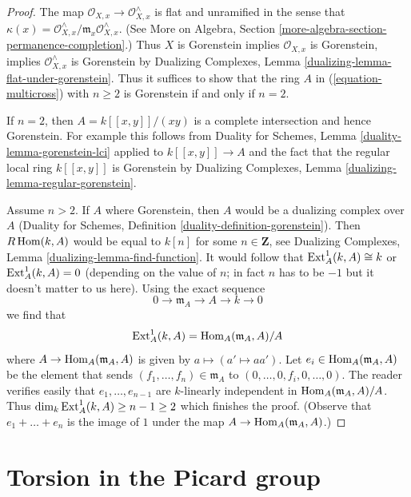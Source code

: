 \begin{proof}
The map $\mathcal{O}_{X, x} \to \mathcal{O}_{X, x}^\wedge$
is flat and unramified in the sense that
$\kappa(x) = \mathcal{O}_{X, x}^\wedge/\mathfrak m_x \mathcal{O}_{X, x}^\wedge$.
(See More on Algebra, Section \ref{more-algebra-section-permanence-completion}.)
Thus $X$ is Gorenstein implies $\mathcal{O}_{X, x}$ is Gorenstein, implies
$\mathcal{O}_{X, x}^\wedge$ is Gorenstein by
Dualizing Complexes, Lemma \ref{dualizing-lemma-flat-under-gorenstein}.
Thus it suffices to show that the ring $A$ in
(\ref{equation-multicross}) with $n \geq 2$
is Gorenstein if and only if $n = 2$.

\medskip\noindent
If $n = 2$, then $A = k[[x, y]]/(xy)$ is a complete intersection
and hence Gorenstein. For example this follows from
Duality for Schemes, Lemma \ref{duality-lemma-gorenstein-lci}
applied to $k[[x, y]] \to A$ and the fact that the regular
local ring $k[[x, y]]$ is Gorenstein by
Dualizing Complexes, Lemma \ref{dualizing-lemma-regular-gorenstein}.

\medskip\noindent
Assume $n > 2$. If $A$ where Gorenstein, then $A$ would be a
dualizing complex over $A$
(Duality for Schemes, Definition \ref{duality-definition-gorenstein}).
Then $R\mathop{\mathrm{Hom}}\nolimits(k, A)$ would be equal to $k[n]$ for some $n \in \mathbf{Z}$, see
Dualizing Complexes, Lemma \ref{dualizing-lemma-find-function}.
It would follow that $\mathop{\mathrm{Ext}}\nolimits^1_A(k, A) \cong k$
or $\mathop{\mathrm{Ext}}\nolimits^1_A(k, A) = 0$ (depending on the value of $n$;
in fact $n$ has to be $-1$ but it doesn't matter to us here).
Using the exact sequence
$$
0 \to \mathfrak m_A \to A \to k \to 0
$$
we find that
$$
\mathop{\mathrm{Ext}}\nolimits^1_A(k, A) = \mathop{\mathrm{Hom}}\nolimits_A(\mathfrak m_A, A)/A
$$
where $A \to \mathop{\mathrm{Hom}}\nolimits_A(\mathfrak m_A, A)$ is given by
$a \mapsto (a' \mapsto aa')$. Let $e_i \in \mathop{\mathrm{Hom}}\nolimits_A(\mathfrak m_A, A)$
be the element that sends $(f_1, \ldots, f_n) \in \mathfrak m_A$ to
$(0, \ldots, 0, f_i, 0, \ldots, 0)$. The reader verifies easily
that $e_1, \ldots, e_{n - 1}$ are $k$-linearly independent in
$\mathop{\mathrm{Hom}}\nolimits_A(\mathfrak m_A, A)/A$. Thus
$\dim_k \mathop{\mathrm{Ext}}\nolimits^1_A(k, A) \geq n - 1 \geq 2$ which
finishes the proof.
(Observe that $e_1 + \ldots + e_n$ is the image of $1$ under the map
$A \to \mathop{\mathrm{Hom}}\nolimits_A(\mathfrak m_A, A)$.)
\end{proof}




\section{Torsion in the Picard group}
\label{section-torsion-in-pic}

